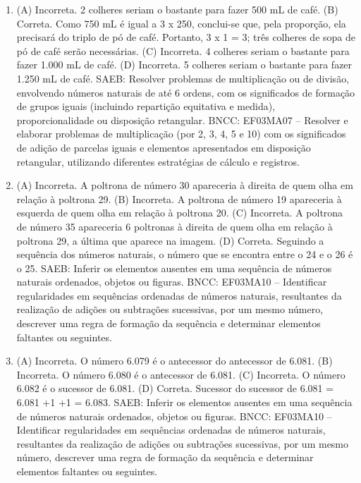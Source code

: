 \begin{enumerate}
\item
(A) Incorreta. 2 colheres seriam o bastante para fazer 500 mL de café.
(B) Correta. Como 750 mL é igual a 3 x 250, conclui-se que, pela proporção, ela
precisará do triplo de pó de café. Portanto, 3 x 1 = 3; três colheres de sopa de pó de café serão necessárias.
(C) Incorreta. 4 colheres seriam o bastante para fazer 1.000 mL de café.
(D) Incorreta. 5 colheres seriam o bastante para fazer 1.250 mL de café.
SAEB: Resolver problemas de multiplicação ou de divisão, envolvendo números naturais de até 6 ordens, com os significados de formação de grupos iguais (incluindo repartição equitativa e medida), proporcionalidade ou disposição retangular.
BNCC: EF03MA07 – Resolver e elaborar problemas de multiplicação (por 2, 3, 4, 5 e 10) com os
significados de adição de parcelas iguais e elementos apresentados em disposição retangular,
utilizando diferentes estratégias de cálculo e registros.

\item
(A) Incorreta. A poltrona de número 30 apareceria à direita de quem olha em relação à poltrona 29.
(B) Incorreta. A poltrona de número 19 apareceria à esquerda de quem olha em relação à poltrona 20.
(C) Incorreta. A poltrona de número 35 apareceria  6 poltronas à direita de quem olha em relação à poltrona 29, a última que aparece na imagem.
(D) Correta. Seguindo a sequência dos números naturais, o número que se encontra entre o 24 e o 26 é o 25.
SAEB: Inferir os elementos ausentes em uma sequência de
números naturais ordenados, objetos ou figuras.
BNCC: EF03MA10 -- Identificar regularidades em sequências ordenadas de números naturais,
resultantes da realização de adições ou subtrações sucessivas, por um mesmo número,
descrever uma regra de formação da sequência e determinar elementos faltantes ou seguintes.

\item
(A) Incorreta. O número 6.079 é o antecessor do antecessor de 6.081.
(B) Incorreta. O número 6.080 é o antecessor de 6.081.
(C) Incorreta. O número 6.082 é o sucessor de 6.081.
(D) Correta. Sucessor do sucessor de 6.081 = 6.081 +1 +1 = 6.083.
SAEB: Inferir os elementos ausentes em uma sequência de números naturais ordenados, objetos ou figuras.
BNCC: EF03MA10 -- Identificar regularidades em sequências ordenadas de números naturais,
resultantes da realização de adições ou subtrações sucessivas, por um mesmo número,
descrever uma regra de formação da sequência e determinar elementos faltantes ou seguintes.
\end{enumerate}

